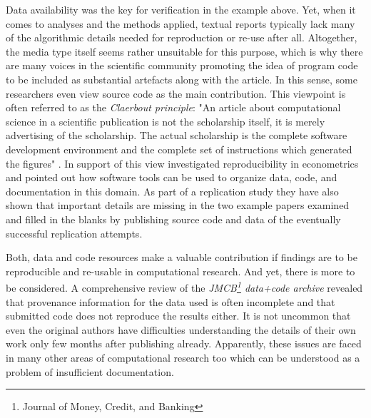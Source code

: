 \documentclass{acm_proc_article-sp}
\begin{document}
Data availability was the key for verification in the example above.
Yet, when it comes to analyses and the methods applied, textual reports typically lack many of the algorithmic details needed for reproduction or re-use after all.
Altogether, the media type itself seems rather unsuitable for this purpose, which is why there are many voices in the scientific community promoting the idea of program code to be included as substantial artefacts along with the article.
In this sense, some researchers even view source code as the main contribution.
This viewpoint is often referred to as the \textit{Claerbout principle}:
"An article about computational science in a scientific publication is not the scholarship itself, it is merely advertising of  the scholarship. The actual scholarship is the complete software development environment and the complete set of instructions which generated the figures" \cite{Buckheit1995b} \cite{de2001reproducible}.
In support of this view \cite{KoenkerZeileis2009} investigated reproducibility in econometrics and pointed out how software tools can be used to organize data, code, and documentation in this domain.
As part of a replication study they have also shown that important details are missing in the two example papers examined and filled in the blanks by publishing source code and data of the eventually successful replication attempts.

Both, data and code resources make a valuable contribution if findings are to be reproducible and re-usable in computational research.
And yet, there is more to be considered.
A comprehensive review of the \textit{JMCB\footnote{Journal of Money, Credit, and Banking} data+code archive} revealed that provenance information for the data used is often incomplete and that submitted code does not reproduce the results either.
It is not uncommon that even the original authors have difficulties understanding the details of their own work only few months after publishing already.
Apparently, these issues are faced in many other areas of computational research too
\cite{hothorn2011case}
\cite{gonzalez2012reproducibility}
\cite{vandewalle2009reproducible}
\cite{cassey2006reproducibility}
which can be understood as a problem of insufficient documentation.
\end{document}
